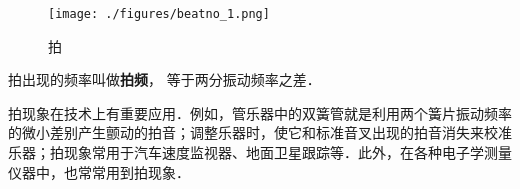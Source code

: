 \begin{figure}[ht]
\centering
\texttt{[image: ./figures/beatno\_1.png]}
\caption{拍} \label{beatno_fig1}
\end{figure}

拍出现的频率叫做\textbf{拍频}， 等于两分振动频率之差．

拍现象在技术上有重要应用．例如，管乐器中的双簧管就是利用两个簧片振动频率的微小差别产生颤动的拍音；调整乐器时，使它和标准音叉出现的拍音消失来校准乐器；拍现象常用于汽车速度监视器、地面卫星跟踪等．此外，在各种电子学测量仪器中，也常常用到拍现象．